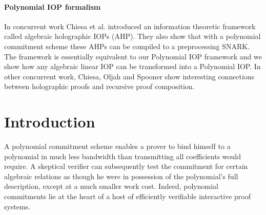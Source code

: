 \paragraph{Polynomial IOP formalism}
In concurrent work Chiesa et al.\cite{Marlin} introduced an information theoretic framework called algebraic holographic IOPs (AHP). They also show that with a polynomial commitment scheme these AHPs can be compiled to a preprocessing SNARK. The framework is essentially equivalent to our Polynomial IOP framework and we show how any algebraic linear IOP can be transformed into a Polynomial IOP. 
In other concurrent work, Chiesa, Oljah and Spooner show interesting connections between holographic proofs and recursive proof composition\cite{Fractal}.


\section{Introduction}

A polynomial commitment scheme enables a prover to bind himself to a polynomial in much less bandwidth than transmitting all coefficients would require. A skeptical verifier can subsequently test the commitment for certain algebraic relations as though he were in possession of the polynomial's full description, except at a much smaller work cost. Indeed, polynomial commitments lie at the heart of a host of efficiently verifiable interactive proof systems.

